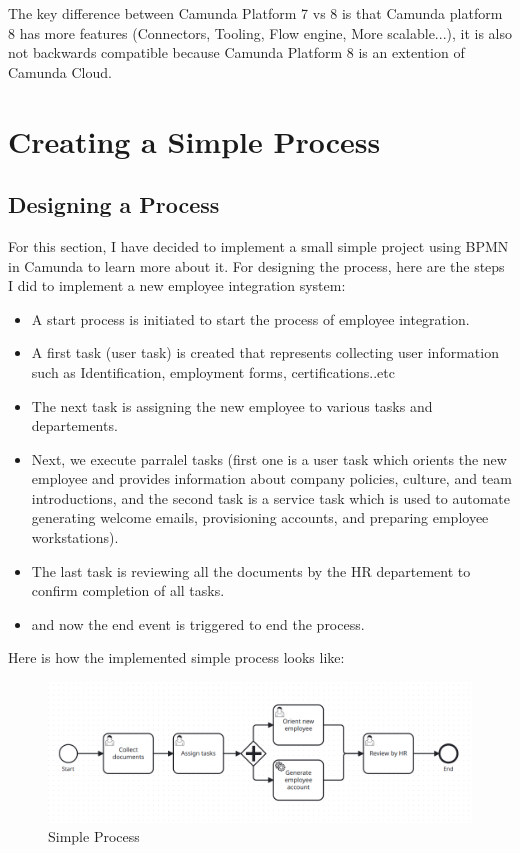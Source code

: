 \documentclass[12pt]{article}
\begin{document}
{  The key difference between Camunda Platform 7 vs 8 is that Camunda platform 8 has more features (Connectors, Tooling, Flow engine, More scalable...), it is also not backwards compatible because Camunda Platform 8 is an extention of Camunda Cloud.

  \section{Creating a Simple Process}

  \subsection{Designing a Process}

  For this section, I have decided to implement a small simple project using BPMN in Camunda to learn more about it.
  For designing the process, here are the steps I did to implement a new employee integration system:

  \begin{itemize}
    \item A start process is initiated to start the process of employee integration.
    \item A first task (user task) is created that represents collecting user information such as Identification, employment forms, certifications..etc
    \item The next task is assigning the new employee to various tasks and departements.
    \item Next, we execute parralel tasks (first one is a user task which orients the new employee and provides information about company policies, culture, and team introductions, and the second task is a service task which is used to automate generating welcome emails, provisioning accounts, and preparing employee workstations).
    \item The last task is reviewing all the documents by the HR departement to confirm completion of all tasks.
    \item and now the end event is triggered to end the process.
  \end{itemize}

  \pagebreak

  Here is how the implemented simple process looks like:

  \begin{figure}[h]
    \centering
    \includegraphics[width=.90\linewidth]{simple_process.png}
    \caption{Simple Process}
    \label{fig:simple_process}
  \end{figure}

}
\end{document}
